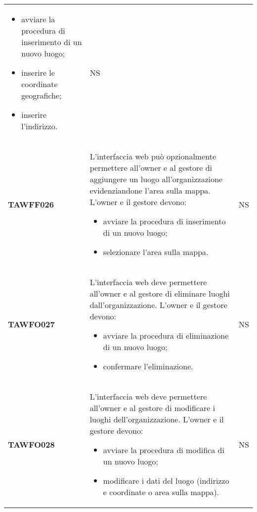 \documentclass[../piano-di-qualifica.tex]{subfiles}
\begin{document}
\begin{centering}
\begin{longtable}[H]{>{\centering\bfseries}m{3cm} >{}p{10cm} >{\centering\arraybackslash}m{3cm}}
\begin{itemize}
                      \item avviare la procedura di inserimento di un nuovo luogo;
                      \item inserire le coordinate geografiche;
                      \item inserire l'indirizzo.
                      \end{itemize}
                      & NS \\
        TAWFF026      & L'interfaccia web può opzionalmente permettere all'owner e al
                      gestore di aggiungere un luogo all'organizzazione evidenziandone
                      l'area sulla mappa. \newline
                      L'owner e il gestore devono:
                      \begin{itemize}
                      \item avviare la procedura di inserimento di un nuovo luogo;
                      \item selezionare l'area sulla mappa.
                      \end{itemize}
                      & NS \\
        TAWFO027      & L'interfaccia web deve permettere all'owner e al gestore di eliminare luoghi dall'organizzazione. \newline
                      L'owner e il gestore devono:
                      \begin{itemize}
                      \item avviare la procedura di eliminazione di un nuovo luogo;
                      \item confermare l'eliminazione.
                      \end{itemize}
                      & NS \\
        TAWFO028      & L'interfaccia web deve permettere all'owner e al gestore di modificare i luoghi dell'organizzazione. \newline
                      L'owner e il gestore devono:
                      \begin{itemize}
                      \item avviare la procedura di modifica di un nuovo luogo;
                      \item modificare i dati del luogo (indirizzo e coordinate o area sulla mappa).
                      \end{itemize}
                      & NS \\

\end{longtable}
\end{centering}
\end{document}
